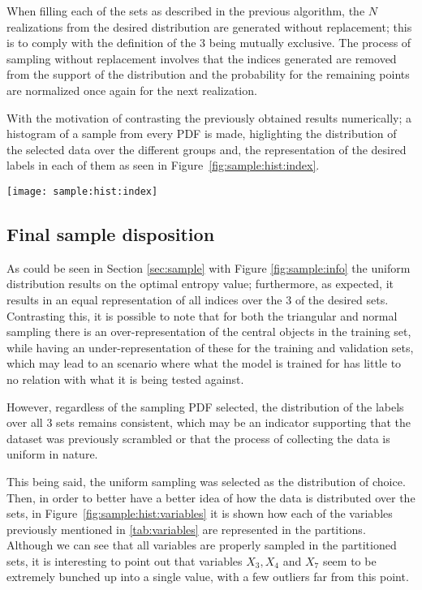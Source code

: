 \documentclass[journal]{IEEEtran}
\begin{document}
When filling each of the sets as described in the previous algorithm, the $N$
realizations from the desired distribution are generated without replacement;
this is to comply with the definition of the $3$ being mutually exclusive. The
process of sampling without replacement involves that the indices generated are
removed from the support of the distribution and the probability for the
remaining points are normalized once again for the next realization.

With the motivation of contrasting the previously obtained results numerically;
a histogram of a sample from every PDF is made, higlighting the distribution of
the selected data over the different groups and, the representation of the
desired labels in each of them as seen in Figure~\ref{fig:sample:hist:index}.

\begin{figure*}[ht]
    \texttt{[image: sample:hist:index]}
    \caption{Distribution of indices over data sets. \label{fig:sample:hist:index}}
\end{figure*}

\subsection{Final sample disposition\label{sec:sample:final}}

As could be seen in Section \ref{sec:sample} with Figure \ref{fig:sample:info}
the uniform distribution results on the optimal entropy value; furthermore, as
expected, it results in an equal representation of all indices over the $3$ of
the desired sets. Contrasting this, it is possible to note that for both the
triangular and normal sampling there is an over-representation of the central
objects in the training set, while having an under-representation of these for
the training and validation sets, which may lead to an scenario where what the
model is trained for has little to no relation with what it is being tested
against.

However, regardless of the sampling PDF selected, the distribution of the labels
over all $3$ sets remains consistent, which may be an indicator supporting that the
dataset was previously scrambled or that the process of collecting the data is
uniform in nature.

This being said, the uniform sampling was selected as the distribution of
choice. Then, in order to better have a better idea of how the data is
distributed over the sets, in Figure~\ref{fig:sample:hist:variables} it is shown
how each of the variables previously mentioned in \ref{tab:variables} are
represented in the partitions. Although we can see that all variables are
properly sampled in the partitioned sets, it is interesting to point out that
variables $X_3, X_4$ and $X_7$ seem to be extremely bunched up into a single
value, with a few outliers far from this point. 
\end{document}
